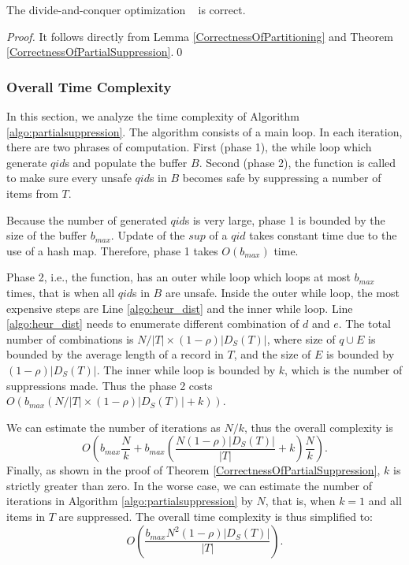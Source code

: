 \begin{corollary}
The divide-and-conquer optimization \SplitData~ is correct.
\end{corollary}
\begin{proof}
It follows directly from Lemma \ref{CorrectnessOfPartitioning} and
Theorem \ref{CorrectnessOfPartialSuppression}.\qed
\end{proof}

\subsubsection{Overall Time Complexity}
\label{sec:imp}
In this section, we analyze the time complexity of Algorithm \ref{algo:partialsuppression}.
The algorithm consists of a main loop. In each iteration,
there are two phrases of computation. First (phase 1), the while loop
which generate $qid$s and populate the buffer $B$. Second (phase 2), 
the \SanitizeBuffer function is called to make sure every 
unsafe $qid$s in $B$ becomes safe by suppressing a number of items from $T$.

Because the number of generated $qid$s is very large, phase 1 is bounded by the size of the buffer $b_{max}$. Update of the $sup$ of a $qid$ takes constant time due to the use of a hash map. Therefore, phase 1 takes $O(b_{max})$ time.

Phase 2, i.e., the \SanitizeBuffer function, has an outer while loop which
loops at most $b_{max}$ times, that is when all $qid$s in $B$ are unsafe. 
Inside the outer while loop, the most expensive steps are Line \ref{algo:heur_dist} and the inner while loop. 
Line \ref{algo:heur_dist} needs to enumerate different combination of $d$ and $e$. 
The total number of combinations is $N/|T|\times(1-\rho)|D_S(T)|$,
where size of $q \cup E$ is bounded by the average length of a record in $T$,
and the size of $E$ is bounded by $(1-\rho)|D_S(T)|$. The inner while loop
is bounded by $k$, which is the number of suppressions made. 
Thus the phase 2 costs $O(b_{max} (N/|T|\times(1-\rho)|D_S(T)| + k))$.

We can estimate the number of iterations as $N/k$, 
thus the overall complexity is
\[O\left(b_{max}\frac{N}{k} +b_{max}(\frac{ N(1-\rho)|D_S(T)|}{|T|}+ k)
\frac{N}{k}\right).\]
Finally, as shown in the proof of Theorem \ref{CorrectnessOfPartialSuppression},
$k$ is strictly greater than zero. In the worse case, we can estimate the number of 
iterations in  Algorithm \ref{algo:partialsuppression} by $N$, that is, when
$k=1$ and all items in $T$ are suppressed. The overall time complexity
is thus simplified to:
\begin{equation}
O\left(\frac{b_{max} N^2(1-\rho)|D_S(T)|}{|T|}\right). \label{eq:timecomp}
\end{equation}

